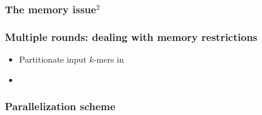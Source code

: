 \begin{frame}
	\frametitle{The memory issue$^{2}$}
	\centering
\end{frame}


\begin{frame}

	\frametitle{Multiple rounds: dealing with memory restrictions}
	\centering
	
	\begin{itemize}
	  \item Partitionate input $k$-mers in 
	  \item 
	\end{itemize}

\end{frame}


\begin{frame}
	\frametitle{Parallelization scheme}
	\centering
\end{frame}
